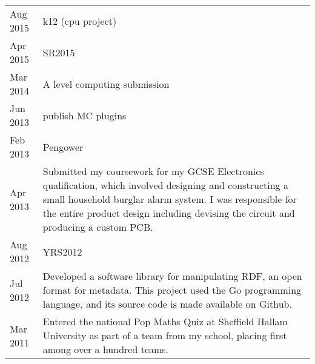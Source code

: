 

{
\setlength{\extrarowheight}{.7em}
\begin{tabu} to \textwidth {X[1,l] X[8,l]}
    Aug 2015 & k12 (cpu project) \\
    Apr 2015 & SR2015 \\
    Mar 2014 & A level computing submission \\
    Jun 2013 & publish MC plugins \\
    Feb 2013 & Pengower \\
    Apr 2013 & Submitted my coursework for my GCSE Electronics qualification, which involved designing and constructing a small household burglar alarm system. I was responsible for the entire product design including devising the circuit and producing a custom PCB. \\
    Aug 2012 & YRS2012 \\
    Jul 2012 & Developed a software library for manipulating RDF, an open format for metadata. This project used the Go programming language, and its source code is made available on Github. \\
    Mar 2011 & Entered the national Pop Maths Quiz at Sheffield Hallam University as part of a team from my school, placing first among over a hundred teams. \\
\end{tabu}
}
